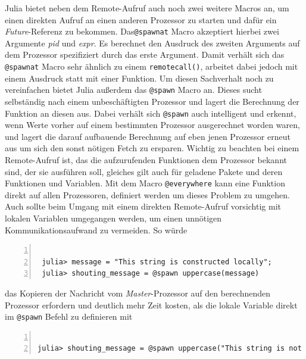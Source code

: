 \documentclass[proseminar,german,utf8]{zihpub}
\begin{document}
Julia bietet neben dem Remote-Aufruf auch noch zwei weitere Macros an, um einen direkten Aufruf an einen anderen Prozessor zu starten und dafür ein \textit{Future}-Referenz zu bekommen. Das\verb|@spawnat| Macro akzeptiert hierbei zwei Argumente \textit{pid} und \textit{expr}. Es berechnet den Ausdruck des zweiten Arguments auf dem Prozessor spezifiziert durch das erste Argument.  Damit verhält sich das \verb|@spawnat| Macro sehr ähnlich zu einem \verb|remotecall()|, arbeitet dabei jedoch mit einem Ausdruck statt mit einer Funktion. Um diesen Sachverhalt noch zu vereinfachen bietet Julia außerdem das \verb|@spawn| Macro an. Dieses sucht selbständig nach einem unbeschäftigten Prozessor und lagert die Berechnung der Funktion an diesen aus. Dabei verhält sich \verb|@spawn| auch intelligent und erkennt, wenn Werte vorher auf einem bestimmten Prozessor ausgerechnet worden waren, und lagert die darauf aufbauende Berechnung auf eben jenen Prozessor erneut aus um sich den sonst nötigen Fetch zu ersparen. Wichtig zu beachten bei einem Remote-Aufruf ist, das die aufzurufenden Funktionen dem Prozessor bekannt sind, der sie ausführen soll, gleiches gilt auch für geladene Pakete und deren Funktionen und Variablen. Mit dem Macro \verb|@everywhere| kann eine Funktion direkt auf allen Prozessoren, definiert werden um dieses Problem zu umgehen. Auch sollte beim Umgang mit einem direkten Remote-Aufruf vorsichtig mit lokalen Variablen umgegangen werden, um einen unnötigen Kommunikationsaufwand zu vermeiden. So würde

\begin{Verbatim}[baselinestretch=1,fontsize=\scriptsize,numbers=left,stepnumber=5,xleftmargin=1cm,xrightmargin=1cm]

 julia> message = "This string is constructed locally";
 julia> shouting_message = @spawn uppercase(message)

\end{Verbatim} 

das Kopieren der Nachricht vom \textit{Master}-Prozessor auf den berechnenden Prozessor erfordern und deutlich mehr Zeit kosten, als die lokale Variable direkt im \verb|@spawn| Befehl zu definieren mit 
\begin{Verbatim}[baselinestretch=1,fontsize=\scriptsize,numbers=left,stepnumber=5,xleftmargin=1cm]

julia> shouting_message = @spawn uppercase("This string is not constructed locally")

\end{Verbatim}
\end{document}
